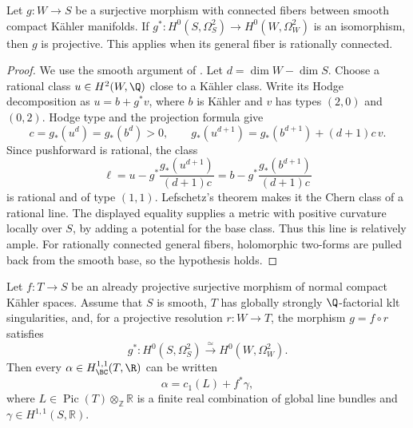 \begin{lemma}
\label{prog:smooth-polarization}
Let \(g:W\to S\) be a surjective morphism with connected fibers
between smooth compact Kähler manifolds. If
\(g^*:H^0(S,\Omega_S^2)\to H^0(W,\Omega_W^2)\) is an isomorphism,
then \(g\) is projective. This applies when its general fiber is
rationally connected.
\end{lemma}

\begin{proof}
We use the smooth argument of \cite[Theorem~3.1, Step~1]{CH}.
Let \(d=\dim W-\dim S\). Choose a rational class \(u\in H^2(W,\Q)\)
close to a Kähler class. Write its Hodge decomposition as
\(u=b+g^*v\), where \(b\) is Kähler and \(v\) has types \((2,0)\)
and \((0,2)\). Hodge type and the projection formula give
\[
 c=g_*(u^d)=g_*(b^d)>0,\qquad
 g_*(u^{d+1})=g_*(b^{d+1})+(d+1)c\,v.
\]
Since pushforward is rational, the class
\[
 \ell=u-g^*\frac{g_*(u^{d+1})}{(d+1)c}
      =b-g^*\frac{g_*(b^{d+1})}{(d+1)c}
\]
is rational and of type \((1,1)\). Lefschetz's theorem makes it the
Chern class of a rational line. The displayed equality supplies a
metric with positive curvature locally over \(S\), by adding a
potential for the base class. Thus this line is relatively ample.
For rationally connected general fibers, holomorphic two-forms are
pulled back from the smooth base, so the hypothesis holds.
\end{proof}

\begin{lemma}
\label{prog:relative-hodge}
Let $f:T\to S$ be an already projective surjective morphism of normal
compact K\"ahler spaces. Assume that $S$ is smooth, $T$ has globally
strongly $\Q$-factorial klt singularities, and, for a projective resolution
$r:W\to T$, the morphism $g=f\circ r$ satisfies
\[
 g^*:H^0(S,\Omega_S^2)\xrightarrow{\ \simeq\ }
                         H^0(W,\Omega_W^2).
\]
Then every $\alpha\in H^{1,1}_{\BC}(T,\R)$ can be written
\[
                         \alpha=c_1(L)+f^*\gamma,
\]
where $L\in\operatorname{Pic}(T)\otimes_{\mathbb Z}\mathbb R$ is a
finite real combination of global line bundles and
$\gamma\in H^{1,1}(S,\mathbb R)$.
\end{lemma}

